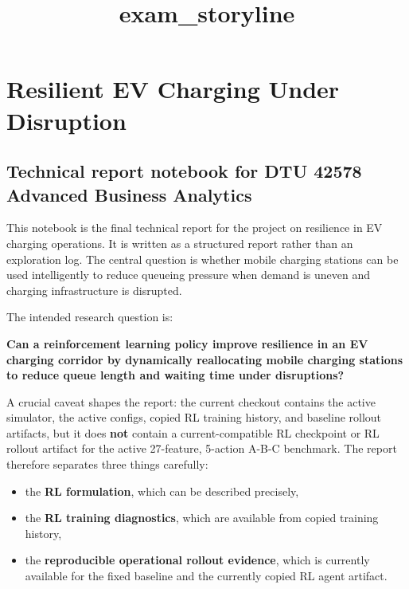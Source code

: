 \documentclass[11pt]{article}
\title{exam\_storyline}
\providecommand{\tightlist}{%
      \setlength{\itemsep}{0pt}\setlength{\parskip}{0pt}}
\begin{document}
    
    \maketitle
    
    

    
    \section{Resilient EV Charging Under
Disruption}\label{resilient-ev-charging-under-disruption}

\subsection{Technical report notebook for DTU 42578 Advanced Business
Analytics}\label{technical-report-notebook-for-dtu-42578-advanced-business-analytics}

This notebook is the final technical report for the project on
resilience in EV charging operations. It is written as a structured
report rather than an exploration log. The central question is whether
mobile charging stations can be used intelligently to reduce queueing
pressure when demand is uneven and charging infrastructure is disrupted.

The intended research question is:

\textbf{Can a reinforcement learning policy improve resilience in an EV
charging corridor by dynamically reallocating mobile charging stations
to reduce queue length and waiting time under disruptions?}

A crucial caveat shapes the report: the current checkout contains the
active simulator, the active configs, copied RL training history, and
baseline rollout artifacts, but it does \textbf{not} contain a
current-compatible RL checkpoint or RL rollout artifact for the active
27-feature, 5-action A-B-C benchmark. The report therefore separates
three things carefully:

\begin{itemize}
\tightlist
\item
  the \textbf{RL formulation}, which can be described precisely,
\item
  the \textbf{RL training diagnostics}, which are available from copied
  training history,
\item
  the \textbf{reproducible operational rollout evidence}, which is
  currently available for the fixed baseline and the currently copied RL
  agent artifact.
\end{itemize}
\end{document}
